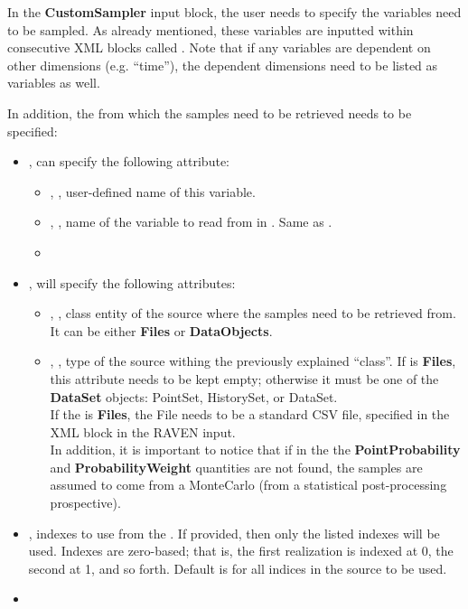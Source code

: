In the \textbf{CustomSampler} input block, the user needs to specify the variables need to be sampled. As
already mentioned, these variables are inputted within consecutive XML blocks called .  Note
that if any variables are dependent on other dimensions (e.g. ``time''), the dependent dimensions need to be
listed as variables as well.

In addition, the  from which the samples need to be retrieved needs to be specified:
\begin{itemize}
  \item {},  can specify the following attribute:
    \begin{itemize}
      \item {}, , user-defined name of this variable.
      \item {}, , name of the variable to read from in
        .   Same as .
      \item \shapeVariableDescription
    \end{itemize}
 \item {},  will specify the following attributes:
  \begin{itemize}
    \item {}, , class entity of the source where the samples need to be retrieved from.
     It can be either \textbf{Files} or \textbf{DataObjects}.
     \item {}, , type of the source withing the previously explained ``class''.
      If  is  \textbf{Files}, this attribute needs to be kept empty; otherwise it must be one
      of the \textbf{DataSet} objects: PointSet, HistorySet, or DataSet.
      \\ \nb If the   is  \textbf{Files}, the File needs to be a standard CSV file, specified in the
       XML block in the RAVEN input.
      \\ In addition, it is important to notice that if in the   the \textbf{PointProbability} and
      \textbf{ProbabilityWeight} quantities are not found, the samples are assumed to come from a MonteCarlo (from a  statistical
      post-processing prospective).
  \end{itemize}
 \item {},  indexes to use from the
   . If provided, then only the listed indexes will be used. Indexes are zero-based; that is,
   the first realization is indexed at 0, the second at 1, and so forth. Default is for all indices in the
   source to be used.
 \item \constantVariablesDescription
\end{itemize}

